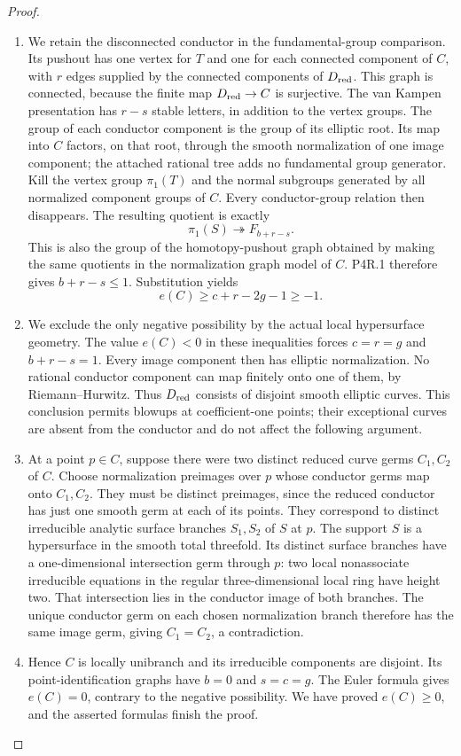 \begin{proof}
\begin{enumerate}[label={$\langle1\rangle$\arabic*.},leftmargin=*]
\item We retain the disconnected conductor in the
fundamental-group comparison. Its pushout has
one vertex for $T$ and one for each connected
component of $C$, with $r$ edges supplied by
the connected components of $D_{\rm red}$.
This graph is connected, because the finite
map $D_{\rm red}\to C$ is surjective.
The van Kampen presentation has $r-s$ stable
letters, in addition to the vertex groups.
The group of each conductor component is the
group of its elliptic root. Its map into $C$
factors, on that root, through the smooth
normalization of one image component; the
attached rational tree adds no fundamental
group generator. Kill the vertex group
$\pi_1(T)$ and the normal subgroups generated
by all normalized component groups of $C$.
Every conductor-group relation then disappears.
The resulting quotient is exactly
\[
 \pi_1(S)\twoheadrightarrow F_{b+r-s}.
\]
This is also the group of the homotopy-pushout
graph obtained by making the same quotients in
the normalization graph model of $C$. P4R.1
therefore gives $b+r-s\le1$. Substitution yields
\[
 e(C)\ge c+r-2g-1\ge-1.
\]

\item We exclude the only negative possibility by
the actual local hypersurface geometry.
The value $e(C)<0$ in these inequalities
forces $c=r=g$ and $b+r-s=1$. Every image
component then has elliptic normalization.
No rational conductor component can map
finitely onto one of them, by
Riemann--Hurwitz. Thus $D_{\rm red}$ consists
of disjoint smooth elliptic curves. This
conclusion permits blowups at coefficient-one
points; their exceptional curves are absent
from the conductor and do not affect the
following argument.

\item At a point $p\in C$, suppose there were two
distinct reduced curve germs $C_1,C_2$ of
$C$. Choose normalization preimages over $p$
whose conductor germs map onto $C_1,C_2$.
They must be distinct preimages, since the
reduced conductor has just one smooth germ
at each of its points. They correspond to
distinct irreducible analytic surface
branches $S_1,S_2$ of $S$ at $p$.
The support $S$ is a hypersurface in the
smooth total threefold. Its distinct
surface branches have a one-dimensional
intersection germ through $p$: two local
nonassociate irreducible equations in the
regular three-dimensional local ring have
height two. That intersection lies in the
conductor image of both branches. The
unique conductor germ on each chosen
normalization branch therefore has the
same image germ, giving $C_1=C_2$, a
contradiction.

\item Hence $C$ is locally unibranch and its
irreducible components are disjoint. Its
point-identification graphs have $b=0$
and $s=c=g$. The Euler formula gives
$e(C)=0$, contrary to the negative
possibility. We have proved $e(C)\ge0$,
and the asserted formulas finish the proof.

\end{enumerate}
\end{proof}
